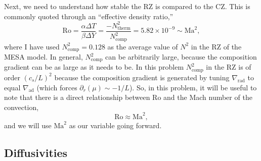 \documentclass[onecolumn, amsmath, amsfonts, amssymb]{aastex62}
\newcommand{\grad}{\ensuremath{\nabla}}
\begin{document}
Next, we need to understand how stable the RZ is compared to the CZ.
This is commonly quoted through an ``effective density ratio,''
\begin{equation}
\mathrm{Ro} = \frac{\alpha \Delta T}{\beta \Delta Y} = \frac{-N_{\mathrm{therm}}^2}{N_{\mathrm{comp}}^2 } = 5.82 \times 10^{-9} \sim \mathrm{Ma}^2,
\end{equation}
where I have used $N_{\mathrm{comp}}^2 = 0.128$ as the average value of $N^2$ in the RZ of the MESA model.
In general, $N_{\mathrm{comp}}^2$ can be arbitrarily large, because the composition gradient can be as large as it needs to be.
In this problem $N_{\mathrm{comp}}^2$ in the RZ is of order $(c_s/L)^2$ because the composition gradient is generated by tuning $\grad_{\mathrm{rad}}$ to equal $\grad_{\mathrm{ad}}$ (which forces $\partial_r(\mu) \sim -1/L$). 
So, in this problem, it will be useful to note that there is a direct relationship between Ro and the Mach number of the convection,
\begin{equation}
\mathrm{Ro} \approx \mathrm{Ma}^2,
\end{equation}
and we will use $\mathrm{Ma}^2$ as our variable going forward.

\subsection{Diffusivities}
\end{document}
